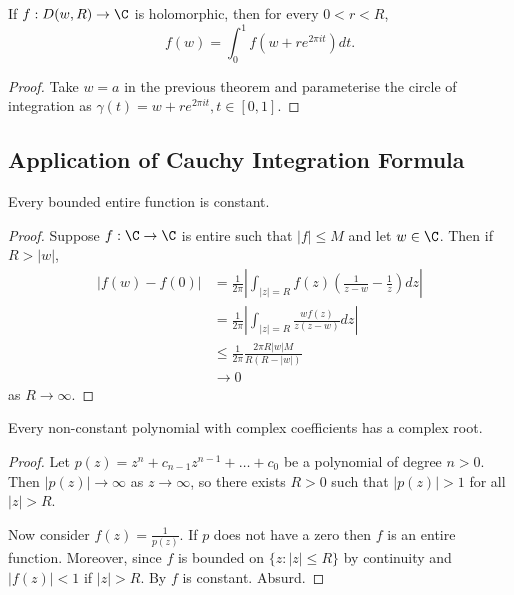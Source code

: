 \documentclass[a4paper]{article}
\begin{document}
\begin{corollary}
  \label{cor:mean-value property}
  If \(f: D(w, R) \to \C\) is holomorphic, then for every \(0 < r < R\),
  \[
    f(w) = \int_0^1 f(w + re^{2\pi it})dt.
  \]
\end{corollary}

\begin{proof}
  Take \(w = a\) in the previous theorem and parameterise the circle of integration as \(\gamma(t) = w + re^{2\pi it}, t \in [0, 1]\).
\end{proof}

\subsection{Application of Cauchy Integration Formula}

\begin{theorem}[Liouville]
  \label{thm:Liouville}
  Every bounded entire function is constant.
\end{theorem}

\begin{proof}
  Suppose \(f: \C \to \C\) is entire such that \(|f| \leq M\) and let \(w \in \C\). Then if \(R > |w|\),
  \begin{align*}
    |f(w) - f(0)|
    &=\frac{1}{2\pi}\left| \int_{|z| = R} f(z) \left( \frac{1}{z - w} - \frac{1}{z} \right) dz \right| \\
    &= \frac{1}{2\pi} \left| \int_{|z| = R} \frac{wf(z)}{z(z - w)} dz \right| \\
    &\leq \frac{1}{2\pi}\frac{2\pi R|w|M}{R(R - |w|)} \\
    &\to 0
  \end{align*}
  as \(R \to \infty\).
\end{proof}

\begin{theorem}
  Every non-constant polynomial with complex coefficients has a complex root.
\end{theorem}

\begin{proof}
  Let \(p(z) = z^n + c_{n - 1}z^{n - 1} + \dots + c_0\) be a polynomial of degree \(n > 0\). Then \(|p(z)| \to \infty\) as \(z \to \infty\), so there exists \(R > 0\) such that \(|p(z)| > 1\) for all \(|z| > R\).

  Now consider \(f(z) = \frac{1}{p(z)}\). If \(p\) does not have a zero then \(f\) is an entire function. Moreover, since \(f\) is bounded on \(\{z: |z| \leq R\}\) by continuity and \(|f(z)| < 1\) if \(|z| > R\). By  \(f\) is constant. Absurd.
\end{proof}
\end{document}
